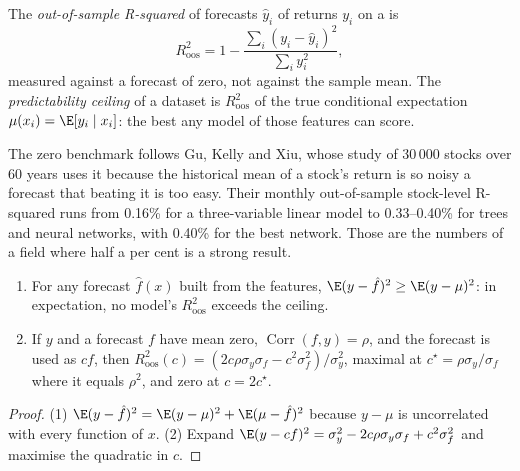 \begin{definition}\label{def:ml:why-financial-machine-learning-is-different:r2}
The \emph{out-of-sample R-squared} of forecasts $\hat y_i$ of returns $y_i$ on a  is
\[
R^2_{\mathrm{oos}} = 1 - \frac{\sum_i(y_i - \hat y_i)^2}{\sum_i y_i^2},
\]
measured against a forecast of zero, not against the sample mean. The \emph{predictability ceiling}
of a dataset is $R^2_{\mathrm{oos}}$ of the true conditional expectation $\mu(x_i) = \E[y_i\mid x_i]$: the best any
model of those features can score.
\end{definition}

The zero benchmark follows Gu, Kelly and Xiu, whose study of 30\,000 stocks over 60 years uses it because the historical
mean of a stock's return is so noisy a forecast that beating it is too easy. Their monthly out-of-sample stock-level
R-squared runs from 0.16\% for a three-variable linear model to 0.33--0.40\% for trees and neural networks, with
0.40\% for the best network. Those are the numbers of a field where half a per cent is a strong result.

\begin{proposition}\label{prop:ml:why:ceiling}
\begin{enumerate}
\item For any forecast $\hat f(x)$ built from the features, $\E(y - \hat f)^2 \ge \E(y - \mu)^2$: in expectation, no
model's $R^2_{\mathrm{oos}}$ exceeds the ceiling.
\item If $y$ and a forecast $f$ have mean zero, $\operatorname{Corr}(f, y) = \rho$, and the forecast is used as $c f$, then
$R^2_{\mathrm{oos}}(c) = (2c\rho\sigma_y\sigma_f - c^2\sigma_f^2)/\sigma_y^2$, maximal at $c^\star = \rho\sigma_y/\sigma_f$
where it equals $\rho^2$, and zero at $c = 2c^\star$.
\end{enumerate}
\end{proposition}

\begin{proof}
(1) $\E(y - \hat f)^2 = \E(y - \mu)^2 + \E(\mu - \hat f)^2$ because $y - \mu$ is uncorrelated with every function of $x$.
(2) Expand $\E(y - cf)^2 = \sigma_y^2 - 2c\rho\sigma_y\sigma_f + c^2\sigma_f^2$ and maximise the quadratic in $c$.
\end{proof}

